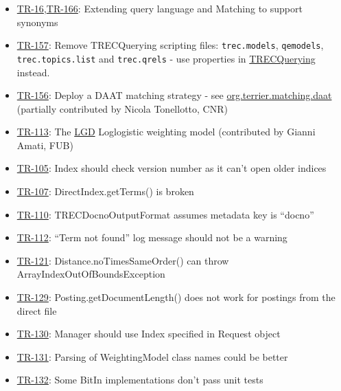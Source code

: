 \begin{itemize}
\tightlist
\item
  \href{http://terrier.org/issues/browse/TR-16}{TR-16},\href{http://terrier.org/issues/browse/TR-166}{TR-166}:
  Extending query language and Matching to support synonyms
\item
  \href{http://terrier.org/issues/browse/TR-157}{TR-157}: Remove
  TRECQuerying scripting files: \texttt{trec.models}, \texttt{qemodels},
  \texttt{trec.topics.list} and \texttt{trec.qrels} - use properties in
  \href{javadoc/org/terrier/applications/TRECQuerying.html}{TRECQuerying}
  instead.
\item
  \href{http://terrier.org/issues/browse/TR-156}{TR-156}: Deploy a DAAT
  matching strategy - see
  \href{javadoc/org/terrier/matching/daat/package-summary.html}{org.terrier.matching.daat}
  (partially contributed by Nicola Tonellotto, CNR)
\item
  \href{http://terrier.org/issues/browse/TR-113}{TR-113}: The
  \href{javadoc/org/terrier/matching/models/LGD.html}{LGD} Loglogistic
  weighting model (contributed by Gianni Amati, FUB)
\item
  \href{http://terrier.org/issues/browse/TR-105}{TR-105}: Index should
  check version number as it can't open older indices
\item
  \href{http://terrier.org/issues/browse/TR-105}{TR-107}:
  DirectIndex.getTerms() is broken
\item
  \href{http://terrier.org/issues/browse/TR-110}{TR-110}:
  TRECDocnoOutputFormat assumes metadata key is ``docno''
\item
  \href{http://terrier.org/issues/browse/TR-110}{TR-112}: ``Term not
  found'' log message should not be a warning
\item
  \href{http://terrier.org/issues/browse/TR-121}{TR-121}:
  Distance.noTimesSameOrder() can throw ArrayIndexOutOfBoundsException
\item
  \href{http://terrier.org/issues/browse/TR-129}{TR-129}:
  Posting.getDocumentLength() does not work for postings from the direct
  file
\item
  \href{http://terrier.org/issues/browse/TR-130}{TR-130}: Manager should
  use Index specified in Request object
\item
  \href{http://terrier.org/issues/browse/TR-131}{TR-131}: Parsing of
  WeightingModel class names could be better
\item
  \href{http://terrier.org/issues/browse/TR-132}{TR-132}: Some BitIn
  implementations don't pass unit tests

\end{itemize}
